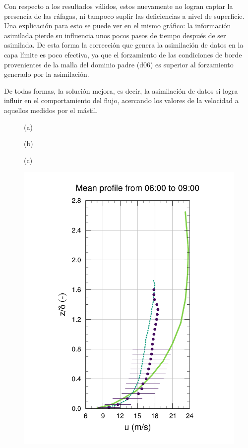 Con respecto a los resultados válidos, estos nuevamente no logran captar la presencia de las ráfagas, ni tampoco suplir las deficiencias a nivel de superficie. Una explicación para esto se puede ver en el mismo gráfico: la información asimilada pierde su influencia unos pocos pasos de tiempo después de ser asimilada. De esta forma la corrección que genera la asimilación de datos en la capa límite es poco efectiva, ya que el forzamiento de las condiciones de borde provenientes de la malla del dominio padre (d06) es superior al forzamiento generado por la asimilación.

De todas formas, la solución mejora, es decir, la asimilación de datos si logra influir en el comportamiento del flujo, acercando los valores de la velocidad a aquellos medidos por el mástil.

\begin{figure}[H]
	\begin{minipage}{0.33\linewidth}
		\centering \hspace{1cm}(a)
	\end{minipage}%
	\begin{minipage}{0.33\linewidth}
		\centering \hspace{0.8cm}(b)
	\end{minipage}%
	\begin{minipage}{0.33\linewidth}
		\centering \hspace{1cm}(c)
	\end{minipage}%
	\vspace{-7mm}
	\begin{center}
	\includegraphics[height=0.61\linewidth,page=37,trim={35mm 10mm 38mm 25mm},clip]{Imagenes/06/hov_da/9u}%

\end{center}
\end{figure}
